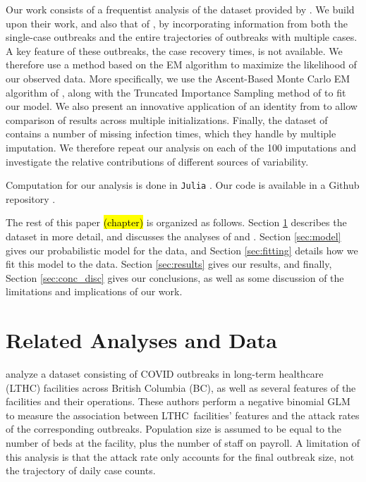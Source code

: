 \documentclass[11pt, oneside]{article}   	%
\newcommand{\lt}{LTHC}
\begin{document}
Our work consists of a frequentist analysis of the dataset provided by \citet{Sto22}. We build upon their work, and also that of \citet{Vij22}, by incorporating information from both the single-case outbreaks and the entire trajectories of outbreaks with multiple cases. A key feature of these outbreaks, the case recovery times, is not available. We therefore use a method based on the EM algorithm to maximize the likelihood of our observed data. More specifically, we use the Ascent-Based Monte Carlo EM algorithm of \citet{Caf05}, along with the Truncated Importance Sampling method of \citet{Ion08} to fit our model. We also present an innovative application of an identity from \citet{Cha95} to allow comparison of results across multiple initializations. Finally, the dataset of \citeauthor{Sto22} contains a number of missing infection times, which they handle by multiple imputation. We therefore repeat our analysis on each of the 100 imputations and investigate the relative contributions of different sources of variability.

Computation for our analysis is done in \texttt{Julia} \citep{Bez17}. Our code is available in a Github repository \citep{need}.

The rest of this paper \hl{(chapter)} is organized as follows. Section \ref{sec:data} describes the dataset in more detail, and discusses the analyses of \citet{Vij22} and \citet{Sto22}. Section \ref{sec:model} gives our probabilistic model for the data, and Section \ref{sec:fitting} details how we fit this model to the data. Section \ref{sec:results} gives our results, and finally, Section \ref{sec:conc_disc} gives our conclusions, as well as some discussion of the limitations and implications of our work.




\section{Related Analyses and Data}
\label{sec:data}


\citet{Vij22} analyze a dataset consisting of COVID outbreaks in long-term healthcare (LTHC) facilities across British Columbia (BC), as well as several features of the facilities and their operations. These authors perform a negative binomial GLM to measure the association between \lt\ facilities' features and the attack rates of the corresponding outbreaks. Population size is assumed to be equal to the number of beds at the facility, plus the number of staff on payroll. A limitation of this analysis is that the attack rate only accounts for the final outbreak size, not the trajectory of daily case counts.
\end{document}

